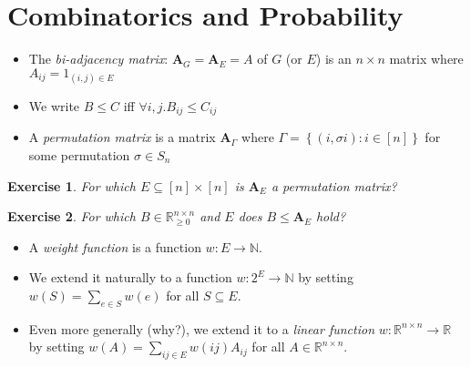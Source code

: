\documentclass{beamer}
\newtheorem{exercise}{Exercise}
\theoremstyle{remark}
\newcommand{\nn}{\mathbb{N}}
\newcommand{\rr}{\mathbb{R}}
\newcommand{\ii}{\rr_{\ge 0}}
\newcommand{\biadj}[1]{\mathbf{A}_{#1}}
\newcommand{\setcomp}[1]{\left\{#1\right\}}
\begin{document}
\section{Combinatorics and Probability}

\begin{frame}
  \begin{definitions}
    \begin{itemize}
      \item The \emph{bi-adjacency matrix}: $\biadj{G} = \biadj{E} = A$ of $G$ (or $E$) is an $n \times n$ matrix where
            $A_{ij} = 1_{(i, j) \in E}$
      \item We write $B \le C$ iff $\forall i, j. B_{ij} \le C_{ij}$
      \item A \emph{permutation matrix} is a matrix $\biadj{\Gamma}$
            where $\Gamma = \setcomp{(i, \sigma i) : i \in [n]}$ for some permutation
            $\sigma \in S_n$

    \end{itemize}
  \end{definitions}

  \begin{exercise}
    For which $E \subseteq [n] \times [n]$ is $\biadj{E}$ a permutation matrix?
  \end{exercise}

  \begin{exercise}
    For which $B \in \ii^{n \times n}$ and $E$ does $B \le \biadj{E}$ hold?
  \end{exercise}
\end{frame}

\begin{frame}
  \begin{definitions}
    \begin{itemize}
      \item A \emph{weight function} is a function $w : E \to \nn$.

      \item We extend it naturally to a function $w : 2^E \to \nn$ by setting
            $w(S) = \sum_{e \in S} w(e)$ for all $S \subseteq E$.

      \item Even more generally (why?), we extend it to a
            \emph{linear function} $w : \rr^{n \times n} \to \rr$ by setting
            $w(A) = \sum_{ij \in E} w(ij) A_{ij}$ for all $A \in \rr^{n \times n}$.
    \end{itemize}
  \end{definitions}
\end{frame}
\end{document}

